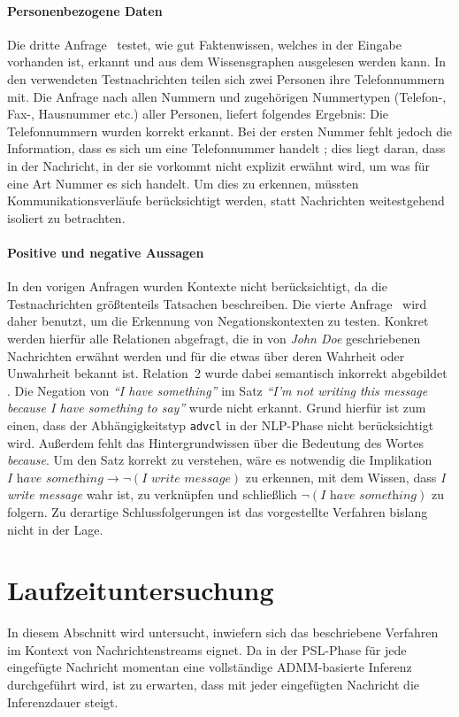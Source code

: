 \paragraph{Personenbezogene Daten}
Die dritte Anfrage~ testet, wie gut Faktenwissen, welches in der Eingabe vorhanden ist, erkannt und aus dem Wissensgraphen ausgelesen werden kann.
In den verwendeten Testnachrichten teilen sich zwei Personen ihre Telefonnummern mit.
Die Anfrage nach allen Nummern und zugehörigen Nummertypen (Telefon-, Fax-, Hausnummer etc.) aller Personen, liefert folgendes Ergebnis:
Die Telefonnummern wurden korrekt erkannt.
Bei der ersten Nummer fehlt jedoch die Information, dass es sich um eine Telefonnummer handelt \errorB;\@
dies liegt daran, dass in der Nachricht, in der sie vorkommt nicht explizit erwähnt wird, um was für eine Art Nummer es sich handelt.
Um dies zu erkennen, müssten Kommunikationsverläufe berücksichtigt werden, statt Nachrichten weitestgehend isoliert zu betrachten.

\paragraph{Positive und negative Aussagen}
In den vorigen Anfragen wurden Kontexte nicht berücksichtigt, da die Testnachrichten größtenteils Tatsachen beschreiben.
Die vierte Anfrage~ wird daher benutzt, um die Erkennung von Negationskontexten zu testen.
Konkret werden hierfür alle Relationen abgefragt, die in von \textit{John Doe} geschriebenen Nachrichten erwähnt werden und für die etwas über deren Wahrheit oder Unwahrheit bekannt ist.
Relation~2 wurde dabei semantisch inkorrekt abgebildet \errorA.
Die Negation von \textit{``I have something''} im Satz \textit{``I'm not writing this message because I have something to say''} wurde nicht erkannt.
Grund hierfür ist zum einen, dass der Abhängigkeitstyp \texttt{advcl} in der NLP-Phase nicht berücksichtigt wird.
Außerdem fehlt das Hintergrundwissen über die Bedeutung des Wortes \textit{because}.
Um den Satz korrekt zu verstehen, wäre es notwendig die Implikation $\textit{I have something} \rightarrow \lnot(\textit{I write message})$ zu erkennen, mit dem Wissen, dass \textit{I write message} wahr ist, zu verknüpfen und schließlich $\lnot(\textit{I have something})$ zu folgern.
Zu derartige Schlussfolgerungen ist das vorgestellte Verfahren bislang nicht in der Lage.

\section{Laufzeituntersuchung}%
\label{sec:evaluation:time}

In diesem Abschnitt wird untersucht, inwiefern sich das beschriebene Verfahren im Kontext von Nachrichtenstreams eignet.
Da in der PSL-Phase für jede eingefügte Nachricht momentan eine vollständige ADMM-basierte Inferenz durchgeführt wird, ist zu erwarten, dass mit jeder eingefügten Nachricht die Inferenzdauer steigt.
